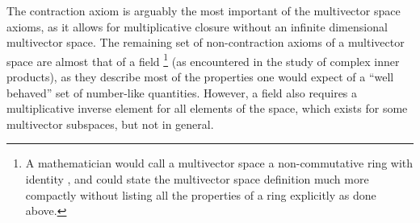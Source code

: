 The contraction axiom is arguably the most important of the multivector space axioms, as it allows for multiplicative closure without an infinite dimensional multivector space.
The remaining set of non-contraction axioms of a multivector space are almost that of a field
\footnote{A mathematician would call a multivector space a non-commutative ring with identity \citep{van1943modern}, and could state the multivector space definition much more compactly without listing all the properties of a ring explicitly as done above.}
(as encountered in the study of complex inner products),
as they describe most of the properties one
would expect of a ``well behaved'' set of number-like quantities.
However, a field also requires a multiplicative inverse element for all elements of the space, which exists for some multivector subspaces, but not in general.


